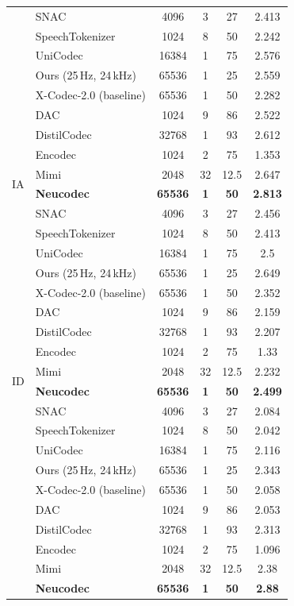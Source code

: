 \documentclass[preprint]{article}
\begin{document}
\begin{longtable}{llcccc}
  & SNAC & 4096 & 3 & 27 & 2.413 \\
  & SpeechTokenizer & 1024 & 8 & 50 & 2.242 \\
  & UniCodec & 16384 & 1 & 75 & 2.576 \\
  & Ours (25\,Hz, 24\,kHz) & 65536 & 1 & 25 & 2.559 \\
  & X-Codec-2.0 (baseline) & 65536 & 1 & 50 & 2.282 \\
\midrule
\multirow{8}{*}{IA}
  & DAC & 1024 & 9 & 86 & 2.522 \\
  & DistilCodec & 32768 & 1 & 93 & 2.612 \\
  & Encodec & 1024 & 2 & 75 & 1.353 \\
  & Mimi & 2048 & 32 & 12.5 & 2.647 \\
  & \textbf{Neucodec} & \textbf{65536} & \textbf{1} & \textbf{50} & \textbf{2.813} \\
  & SNAC & 4096 & 3 & 27 & 2.456 \\
  & SpeechTokenizer & 1024 & 8 & 50 & 2.413 \\
  & UniCodec & 16384 & 1 & 75 & 2.5 \\
  & Ours (25\,Hz, 24\,kHz) & 65536 & 1 & 25 & 2.649 \\
  & X-Codec-2.0 (baseline) & 65536 & 1 & 50 & 2.352 \\
\midrule
\multirow{8}{*}{ID}
  & DAC & 1024 & 9 & 86 & 2.159 \\
  & DistilCodec & 32768 & 1 & 93 & 2.207 \\
  & Encodec & 1024 & 2 & 75 & 1.33 \\
  & Mimi & 2048 & 32 & 12.5 & 2.232 \\
  & \textbf{Neucodec} & \textbf{65536} & \textbf{1} & \textbf{50} & \textbf{2.499} \\
  & SNAC & 4096 & 3 & 27 & 2.084 \\
  & SpeechTokenizer & 1024 & 8 & 50 & 2.042 \\
  & UniCodec & 16384 & 1 & 75 & 2.116 \\
  & Ours (25\,Hz, 24\,kHz) & 65536 & 1 & 25 & 2.343 \\
  & X-Codec-2.0 (baseline) & 65536 & 1 & 50 & 2.058 \\
\newpage
\multirow{8}{*}{IG}
  & DAC & 1024 & 9 & 86 & 2.053 \\
  & DistilCodec & 32768 & 1 & 93 & 2.313 \\
  & Encodec & 1024 & 2 & 75 & 1.096 \\
  & Mimi & 2048 & 32 & 12.5 & 2.38 \\
  & \textbf{Neucodec} & \textbf{65536} & \textbf{1} & \textbf{50} & \textbf{2.88} \\

\end{longtable}
\end{document}
